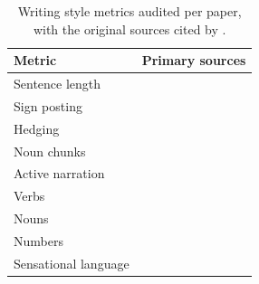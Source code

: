 \begin{table}[h]
  \centering
  \begin{tabular}{ll}
    \toprule
    Metric & Primary sources \\
    \midrule
    Sentence length      & \citet{britton1982sentence, jeong2021readability} \\
    Sign posting         & \citet{lindsay2011scientific, montgomery2003chicago} \\
    Hedging              & \citet{montgomery2003chicago, pinker2014sense, sword2012stylish} \\
    Noun chunks          & \citet{lindsay2011scientific, montgomery2003chicago, pinker2014sense} \\
    Active narration     & \citet{hillier2016narrative, pinker2014sense, sword2012stylish} \\
    Verbs                & \citet{hillier2016narrative, ryba2019verbs} \\
    Nouns                & \citet{crossley2017nouns} \\
    Numbers              & \citet{stremersch2007numbers} \\
    Sensational language & \citet{millar2022sensational} \\
    \bottomrule
  \end{tabular}
  \caption{Writing style metrics audited per paper, with the
  original sources cited by \citet{hohmann2025evolution}.}
  \label{tab:nine}
\end{table}
